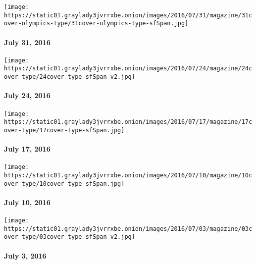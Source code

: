 \texttt{[image: https://static01.graylady3jvrrxbe.onion/images/2016/07/31/magazine/31cover-olympics-type/31cover-olympics-type-sfSpan.jpg]}

\hypertarget{july-31-2016}{%
\paragraph{July 31, 2016}\label{july-31-2016}}

\href{http://www.nytimes3xbfgragh.onion/indexes/2016/07/24/magazine/index.html}{}

\texttt{[image: https://static01.graylady3jvrrxbe.onion/images/2016/07/24/magazine/24cover-type/24cover-type-sfSpan-v2.jpg]}

\hypertarget{july-24-2016}{%
\paragraph{July 24, 2016}\label{july-24-2016}}

\href{http://www.nytimes3xbfgragh.onion/indexes/2016/07/17/magazine/index.html}{}

\texttt{[image: https://static01.graylady3jvrrxbe.onion/images/2016/07/17/magazine/17cover-type/17cover-type-sfSpan.jpg]}

\hypertarget{july-17-2016}{%
\paragraph{July 17, 2016}\label{july-17-2016}}

\href{http://www.nytimes3xbfgragh.onion/indexes/2016/07/10/magazine/index.html}{}

\texttt{[image: https://static01.graylady3jvrrxbe.onion/images/2016/07/10/magazine/10cover-type/10cover-type-sfSpan.jpg]}

\hypertarget{july-10-2016}{%
\paragraph{July 10, 2016}\label{july-10-2016}}

\href{http://www.nytimes3xbfgragh.onion/indexes/2016/07/03/magazine/index.html}{}

\texttt{[image: https://static01.graylady3jvrrxbe.onion/images/2016/07/03/magazine/03cover-type/03cover-type-sfSpan-v2.jpg]}

\hypertarget{july-3-2016}{%
\paragraph{July 3, 2016}\label{july-3-2016}}

